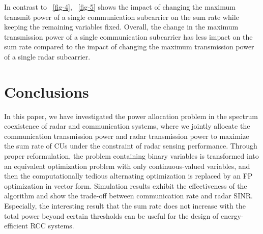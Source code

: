 \documentclass[a4paper,journal,10pt]{IEEEtran}
\begin{document}
In contrast to \figurename~\ref{fig-4}, \figurename~\ref{fig-5} shows the impact of changing the maximum transmit power of a single communication subcarrier on the sum rate while keeping the remaining variables fixed. Overall, the change in the maximum transmission power of a single communication subcarrier has less impact on the sum rate compared to the impact of changing the maximum transmission power of a single radar subcarrier.
\section{Conclusions}\label{sec:Conclusions}
In this paper, we have investigated the power allocation problem in the spectrum coexistence of radar and communication systems, where we jointly allocate the communication transmission power and radar transmission power to maximize the sum rate of CUs under the constraint of radar sensing performance. Through proper reformulation, the problem containing binary variables is transformed into an equivalent optimization problem with only continuous-valued variables, and then the computationally tedious alternating optimization is replaced by an FP optimization in vector form. Simulation results exhibit the effectiveness of the algorithm and show the trade-off between communication rate and radar SINR. Especially, the interesting result that the sum rate does not increase with the total power beyond certain thresholds can be useful for the design of energy-efficient RCC systems.



\vspace{11pt}
	

\vfill
\end{document}
